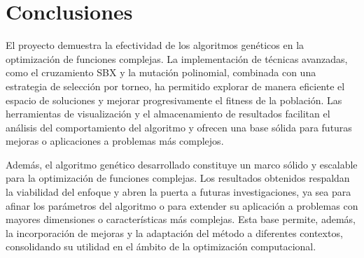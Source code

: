 \chapter{Conclusiones}
El proyecto demuestra la efectividad de los algoritmos genéticos en la optimización de funciones complejas. La implementación de técnicas avanzadas, como el cruzamiento SBX y la mutación polinomial, combinada con una estrategia de selección por torneo, ha permitido explorar de manera eficiente el espacio de soluciones y mejorar progresivamente el fitness de la población. Las herramientas de visualización y el almacenamiento de resultados facilitan el análisis del comportamiento del algoritmo y ofrecen una base sólida para futuras mejoras o aplicaciones a problemas más complejos.

Además, el algoritmo genético desarrollado constituye un marco sólido y escalable para la optimización de funciones complejas. Los resultados obtenidos respaldan la viabilidad del enfoque y abren la puerta a futuras investigaciones, ya sea para afinar los parámetros del algoritmo o para extender su aplicación a problemas con mayores dimensiones o características más complejas. Esta base permite, además, la incorporación de mejoras y la adaptación del método a diferentes contextos, consolidando su utilidad en el ámbito de la optimización computacional.
